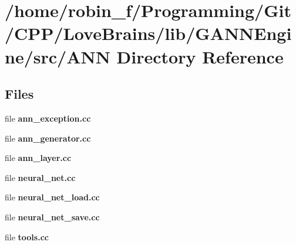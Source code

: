 \section{/home/robin\+\_\+f/\+Programming/\+Git/\+C\+P\+P/\+Love\+Brains/lib/\+G\+A\+N\+N\+Engine/src/\+A\+N\+N Directory Reference}
\label{dir_f1229d378f26768f40f0e24de69396ca}
\subsection*{Files}
\begin{DoxyCompactItemize}
\item 
file {\bfseries ann\+\_\+exception.\+cc}
\item 
file {\bfseries ann\+\_\+generator.\+cc}
\item 
file {\bfseries ann\+\_\+layer.\+cc}
\item 
file {\bfseries neural\+\_\+net.\+cc}
\item 
file {\bfseries neural\+\_\+net\+\_\+load.\+cc}
\item 
file {\bfseries neural\+\_\+net\+\_\+save.\+cc}
\item 
file {\bfseries tools.\+cc}
\end{DoxyCompactItemize}
